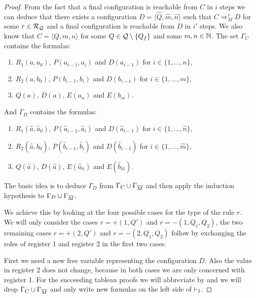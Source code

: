 \begin{proof}
	From the fact that a final configuration is reachable from $C$ in $i$ steps we can deduce that there exists a configuration $D=\langle \widehat{Q}, \widehat{m}, \widehat{n}\rangle$ such that $C\Rightarrow_M^r D$ for some $r\in\mathcal{R}_{\mathcal{Q}}$ and a final configuration is reachable from $D$ in $i'$ steps. We also know that $C=\langle Q,m,n\rangle$ for some $Q\in\mathcal{Q}\setminus\{Q_f\}$ and some $m,n\in\mathbb{N}$.
	The set $\Gamma_C$ contains the formulas: 
	\begin{enumerate}[label=]%
		\item $R_1(a,a_0)$, $P(a_{i-1},a_i)$ and $D(a_{i-1})$ for $i\in\{1,\dots,n\}$,
		\item $R_2(a,b_0)$, $P(b_{i-1},b_i)$ and $D(b_{i-1})$ for $i\in\{1,\dots,m\}$,
		\item $Q(a)$, $D(a)$, $E(a_n)$ and $E(b_m)$.
	\end{enumerate}
	And $\Gamma_D$ contains the formulas:
	\begin{enumerate}[label=]
		\item $R_1(\widehat{a},\widehat{a}_0)$, $P(\widehat{a}_{i-1},\widehat{a}_i)$ and $D(\widehat{a}_{i-1})$ for $i\in\{1,\dots,\widehat{n}\}$,
		\item $R_2(\widehat{a},\widehat{b}_0)$, $P(\widehat{b}_{i-1},\widehat{b}_i)$ and $D(\widehat{b}_{i-1})$ for $i\in\{1,\dots,\widehat{m}\}$,
		\item $Q(\widehat{a})$, $D(\widehat{a})$, $E({\widehat{a}}_{\widehat{n}})$ and $E({\widehat{b}}_{\widehat{m}})$.
	\end{enumerate}
	The basic idea is to deduce $\Gamma_D$ from $\Gamma_C\cup\Gamma_{\overline{M}}$ and then apply the induction hypothesis to $\Gamma_D\cup\Gamma_{\overline{M}}$. 
	\begin{figure}[H]
		\centering
		
	\end{figure}
	
	We achieve this by looking at the four possible cases for the type of the rule $r$. We will only consider the cases $r=+(1,Q')$ and $r=-(1,Q_1,Q_2)$, the two remaining cases $r=+(2,Q')$ and $r=-(2,Q_1,Q_2)$ follow by exchanging the roles of register 1 and register 2 in the first two cases.
	
	First we need a new free variable representing the configuration $D$. Also the value in register 2 does not change, because in both cases we are only concerned with register 1.
	For the succeeding tableau proofs we will abbreviate \false{} by \falses{} and we will drop $\Gamma_C\cup\Gamma_{\overline{M}}$ and only write new formulas on the left side of $\vdash_\text{f}$.
	

\end{proof}
